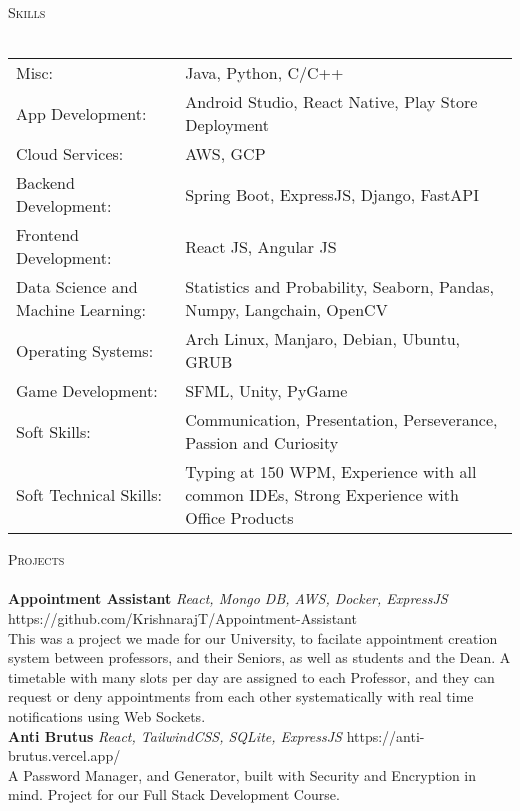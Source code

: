 \documentclass[a4paper]{article}
\newcommand{\lineunder} {
    \vspace*{-8pt} \\
    \hspace*{-18pt} \hrulefill \\
}
\newcommand{\header} [1] {
    {\hspace*{-18pt}\vspace*{6pt} \textsc{#1}}
    \vspace*{-6pt} \lineunder
}
\begin{document}
\header{Skills}
\begin{tabular}{ l l }
	Misc:                              & Java, Python, C/C++                                                                        \\
	App Development:                   & Android Studio, React Native, Play Store Deployment                                        \\
	Cloud Services:                    & AWS, GCP                                                                                   \\
	Backend Development:               & Spring Boot, ExpressJS, Django, FastAPI                                                    \\
	Frontend Development:              & React JS, Angular JS                                                                       \\
	Data Science and Machine Learning: & Statistics and Probability, Seaborn, Pandas, Numpy, Langchain, OpenCV                      \\
	Operating Systems:                 & Arch Linux, Manjaro, Debian, Ubuntu, GRUB                                                  \\
	Game Development:                  & SFML, Unity, PyGame                                                                        \\
	Soft Skills:                       & Communication, Presentation, Perseverance, Passion and Curiosity                           \\
	Soft Technical Skills:             & Typing at 150 WPM, Experience with all common IDEs, Strong Experience with Office Products \\
\end{tabular}
\vspace{2mm}

\header{Projects}
{\textbf{Appointment Assistant}} {\sl React, Mongo DB, AWS, Docker, ExpressJS} \hfill https://github.com/KrishnarajT/Appointment-Assistant\\
This was a project we made for our University, to facilate appointment creation system between professors, and their Seniors, as well as students and the Dean. A timetable with many slots per day are assigned to each Professor, and they can request or deny appointments from each other systematically with real time notifications using Web Sockets.\\
\vspace*{2mm}
{\textbf{Anti Brutus}} {\sl React, TailwindCSS, SQLite, ExpressJS} \hfill https://anti-brutus.vercel.app/\\
A Password Manager, and Generator, built with Security and Encryption in mind. Project for our Full Stack Development Course.\\
\vspace*{2mm}



\ 
\end{document}
